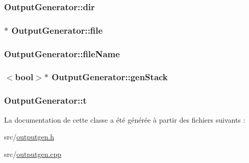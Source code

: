 \subsubsection[{dir}]{ Output\+Generator\+::dir\hspace{0.3cm}{\ttfamily [protected]}}\label{class_output_generator_ac64b8818d57bbe250f647d7b10edd45e}
\hypertarget{class_output_generator_aed5ad11c3844cdf71ec6fee6c1c84286}{}
\subsubsection[{file}]{$\ast$ Output\+Generator\+::file\hspace{0.3cm}{\ttfamily [protected]}}\label{class_output_generator_aed5ad11c3844cdf71ec6fee6c1c84286}
\hypertarget{class_output_generator_a9bb808101dbeae7732bb0fa66cad9176}{}
\subsubsection[{file\+Name}]{ Output\+Generator\+::file\+Name\hspace{0.3cm}{\ttfamily [protected]}}\label{class_output_generator_a9bb808101dbeae7732bb0fa66cad9176}
\hypertarget{class_output_generator_ac734ecb37a17e3b4fa46f249ab495697}{}
\subsubsection[{gen\+Stack}]{$<${\bf bool}$>$$\ast$ Output\+Generator\+::gen\+Stack\hspace{0.3cm}{\ttfamily [protected]}}\label{class_output_generator_ac734ecb37a17e3b4fa46f249ab495697}
\hypertarget{class_output_generator_a55a40a8215efe6adc4d0a587ad9a46bc}{}
\subsubsection[{t}]{ Output\+Generator\+::t\hspace{0.3cm}{\ttfamily [protected]}}\label{class_output_generator_a55a40a8215efe6adc4d0a587ad9a46bc}


La documentation de cette classe a été générée à partir des fichiers suivants \+:\begin{DoxyCompactItemize}
\item 
src/\hyperlink{outputgen_8h}{outputgen.\+h}\item 
src/\hyperlink{outputgen_8cpp}{outputgen.\+cpp}\end{DoxyCompactItemize}
